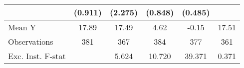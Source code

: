 {\begin{tabular}{l*{5}{c}}
            &     (0.911)         &     (2.275)         &     (0.848)         &     (0.485)         &                     \\
\midrule
Mean Y      &       17.89         &       17.49         &        4.62         &       -0.15         &       17.51         \\
Observations&         381         &         367         &         384         &         377         &         361         \\
Exc. Inst. F-stat&                     &       5.624         &      10.720         &      39.371         &       0.371         \\
\bottomrule
\end{tabular}
}
